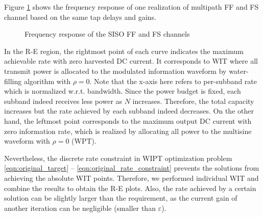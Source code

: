 Figure \ref{fig:siso-channels} shows the frequency response of one realization of multipath FF and FS channel based on the same tap delays and gains.

\begin{figure}[ht]
  \centering
  \caption{Frequency response of the SISO FF and FS channels}\label{fig:siso-channels}
\end{figure}

In the R-E region, the rightmost point of each curve indicates the maximum achievable rate with zero harvested DC current. It corresponds to WIT where all transmit power is allocated to the modulated information waveform by water-filling algorithm with $\rho  = 0$. Note that the x-axis here refers to per-subband rate which is normalized w.r.t. bandwidth. Since the power budget is fixed, each subband indeed receives less power as $N$ increases. Therefore, the total capacity increases but the rate achieved by each subband indeed decreases. On the other hand, the leftmost point corresponds to the maximum output DC current with zero information rate, which is realized by allocating all power to the multisine waveform with $\rho  = 0$ (WPT).

Nevertheless, the discrete rate constraint in WIPT optimization problem \ref{eqn:original_target} -- \ref{eqn:original_rate_constraint} prevents the solutions from achieving the absolute WIT points. Therefore, we performed individual WIT and combine the results to obtain the R-E plots. Also, the rate achieved by a certain solution can be slightly larger than the requirement, as the current gain of another iteration can be negligible (smaller than $\varepsilon$). 